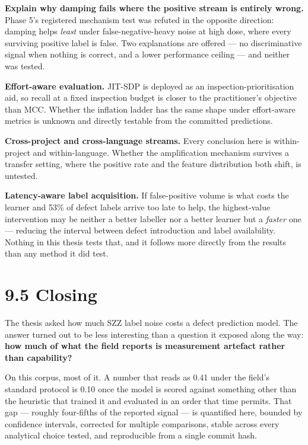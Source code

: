 \textbf{Explain why damping fails where the positive stream is entirely
wrong.} Phase 5's registered mechanism test was refuted in the opposite
direction: damping helps \emph{least} under false-negative-heavy noise
at high dose, where every surviving positive label is false. Two
explanations are offered --- no discriminative signal when nothing is
correct, and a lower performance ceiling --- and neither was tested.

\textbf{Effort-aware evaluation.} JIT-SDP is deployed as an
inspection-prioritisation aid, so recall at a fixed inspection budget is
closer to the practitioner's objective than MCC. Whether the inflation
ladder has the same shape under effort-aware metrics is unknown and
directly testable from the committed predictions.

\textbf{Cross-project and cross-language streams.} Every conclusion here
is within-project and within-language. Whether the amplification
mechanism survives a transfer setting, where the positive rate and the
feature distribution both shift, is untested.

\textbf{Latency-aware label acquisition.} If false-positive volume is
what costs the learner and 53\% of defect labels arrive too late to
help, the highest-value intervention may be neither a better labeller
nor a better learner but a \emph{faster} one --- reducing the interval
between defect introduction and label availability. Nothing in this
thesis tests that, and it follows more directly from the results than
any method it did test.

\section{9.5 Closing}\label{closing}

The thesis asked how much SZZ label noise costs a defect prediction
model. The answer turned out to be less interesting than a question it
exposed along the way: \textbf{how much of what the field reports is
measurement artefact rather than capability?}

On this corpus, most of it. A number that reads as 0.41 under the
field's standard protocol is 0.10 once the model is scored against
something other than the heuristic that trained it and evaluated in an
order that time permits. That gap --- roughly four-fifths of the
reported signal --- is quantified here, bounded by confidence intervals,
corrected for multiple comparisons, stable across every analytical
choice tested, and reproducible from a single commit hash.

